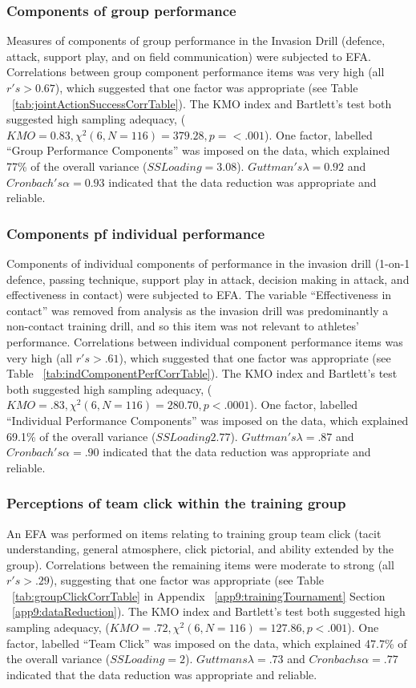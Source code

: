 \subsubsection{Components of group performance}
Measures of components of group performance in the Invasion Drill (defence, attack, support play, and on field communication) were subjected to EFA.  Correlations between group component performance items was very high (all $r's > 0.67$), which suggested that one factor was appropriate (see Table ~\ref{tab:jointActionSuccessCorrTable}).  The KMO index and Bartlett's test both suggested high sampling adequacy, ($KMO =  0.83, \chi^2(6, N = 116) = 379.28, p = <.001$).  One factor, labelled ``Group Performance Components'' was imposed on the data, which explained 77\% of the overall variance ($SS Loading = 3.08$).  $Guttman's \lambda = 0.92$ and $Cronbach's \alpha = 0.93$ indicated that the data reduction was appropriate and reliable.

\subsubsection{Components pf individual performance\label{app9:dataReductionPerformance}}
Components of individual components of performance in the invasion drill (1-on-1 defence, passing technique, support play in attack, decision making in attack, and effectiveness in contact) were subjected to EFA.  The variable ``Effectiveness in contact'' was removed from analysis as the invasion drill was predominantly a non-contact training drill, and so this item was not relevant to athletes' performance.  Correlations between individual component performance items was very high (all $r's > .61$), which suggested that one factor was appropriate (see Table ~\ref{tab:indComponentPerfCorrTable}).  The KMO index and Bartlett's test both suggested high sampling adequacy, ($KMO = .83, \chi^2(6, N = 116) = 280.70, p < .0001$). One factor, labelled ``Individual Performance Components'' was imposed on the data, which explained 69.1\% of the overall variance ($SS Loading  2.77$).  $Guttman's \lambda = .87$  and  $Cronbach's \alpha = .90$ indicated that the data reduction was appropriate and reliable.

\subsubsection{Perceptions of team click within the training group}
An EFA was performed on items relating to training group team click (tacit understanding, general atmosphere, click pictorial, and ability extended by the group).  Correlations between the remaining items were moderate to strong (all $r's > .29$), suggesting that one factor was appropriate (see Table ~\ref{tab:groupClickCorrTable} in Appendix ~\ref{app9:trainingTournament} Section ~\ref{app9:dataReduction}). The KMO index and Bartlett's test both suggested high sampling adequacy, ($KMO =  .72, \chi^2(6, N = 116) = 127.86, p < .001$).
One factor, labelled ``Team Click'' was imposed on the data, which explained 47.7\% of the overall variance ($SS Loading = 2$). $Guttmans \lambda = .73$ and $Cronbachs \alpha = .77$ indicated that the data reduction was appropriate and reliable.

